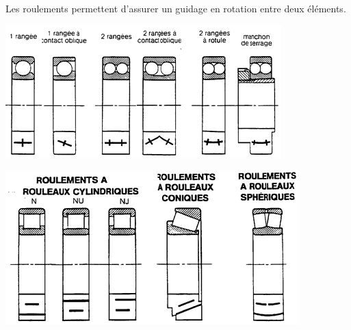 \documentclass[10pt,oneside]{article}
\begin{document}
Les roulements permettent d'assurer un guidage en rotation entre deux éléments.

\begin{minipage}[c]{.35\linewidth}
\begin{center}
\includegraphics[width=.95\textwidth]{png/roulements1}
\end{center}
\end{minipage}\hfill
\begin{minipage}[c]{.35\linewidth}
\begin{center}
\includegraphics[width=.95\textwidth]{png/roulements2}
\end{center}
\end{minipage}\hfill
\end{document}
